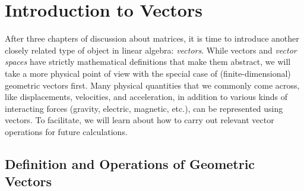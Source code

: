 \chapter{Introduction to Vectors}

After three chapters of discussion about matrices, it is time to introduce another closely related type of object in linear algebra: \textit{vectors}. While vectors and \textit{vector spaces} have strictly mathematical definitions that make them abstract, we will take a more physical point of view with the special case of (finite-dimensional) geometric vectors first. Many physical quantities that we commonly come across, like displacements, velocities, and acceleration, in addition to various kinds of interacting forces (gravity, electric, magnetic, etc.), can be represented using vectors. To facilitate, we will learn about how to carry out relevant vector operations for future calculations.

\section{Definition and Operations of Geometric Vectors}

